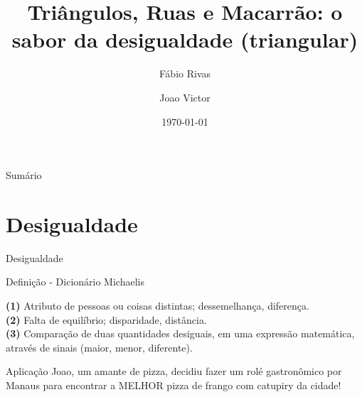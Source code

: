 \documentclass[12pt]{beamer}
\author[Prof. Fábio Rivas \& Joao Victor]{%
Fábio Rivas\inst{1} \and Joao Victor\inst{2}}
\title{Triângulos, Ruas e Macarrão: o sabor da desigualdade (triangular)}
\institute[]{%
  \textsuperscript{1} Professor \\
  \textsuperscript{2} Discente, Licenciatura em Matematica
}
\date{\today}
\begin{document}
\onehalfspacing 
\justifying 

\begin{frame}
    \titlepage
\end{frame}

\begin{frame}{Sumário}
    \tableofcontents
\end{frame}


\section{Desigualdade}

    \begin{frame}{Desigualdade}
        \begin{alertblock}{Definição - Dicionário Michaelis}
        \justifying
        
            \textbf{(1)} Atributo de pessoas ou coisas distintas; dessemelhança, diferença.\\
            \textbf{(2)} Falta de equilíbrio; disparidade, distância.\\
            \textbf{(3)} Comparação de duas quantidades desiguais, em uma expressão matemática, através de sinais (maior, menor, diferente). \\
        \end{alertblock}

        \pause

        \begin{block}{Aplicação}
            Joao, um amante de pizza, decidiu fazer um rolé gastronômico por Manaus para encontrar a MELHOR pizza de frango com catupiry da cidade!
        \end{block}

        
    \end{frame}
\end{document}
